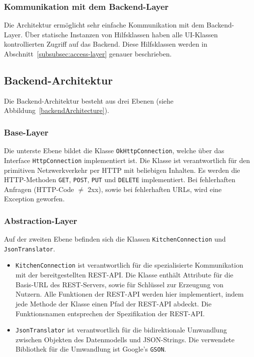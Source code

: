 \subsubsection{Kommunikation mit dem Backend-Layer}

Die Architektur ermöglicht sehr einfache Kommunikation mit dem Backend-Layer.
Über statische Instanzen von Hilfsklassen haben alle UI-Klassen kontrollierten Zugriff auf das Backend.
Diese Hilfsklassen werden in Abschnitt~\ref{subsubsec:access-layer} genauer beschrieben.

\subsection{Backend-Architektur}\label{subsec:backend}

Die Backend-Architektur besteht aus drei Ebenen (siehe Abbildung~\ref{backendArchitecture}).

\subsubsection{Base-Layer}

Die unterste Ebene bildet die Klasse \texttt{OkHttpConnection}, welche über das Interface \texttt{HttpConnection} implementiert ist.
Die Klasse ist verantwortlich für den primitiven Netzwerkverkehr per HTTP mit beliebigen Inhalten.
Es werden die HTTP-Methoden \texttt{GET}, \texttt{POST}, \texttt{PUT} und \texttt{DELETE} implementiert.
Bei fehlerhaften Anfragen (HTTP-Code $\neq$ 2xx), sowie bei fehlerhaften URLs, wird eine Exception geworfen.

\subsubsection{Abstraction-Layer}

Auf der zweiten Ebene befinden sich die Klassen \texttt{KitchenConnection} und \texttt{JsonTranslator}.

\begin{itemize}
	\item  \texttt{KitchenConnection} ist verantwortlich für die spezialisierte Kommunikation mit der bereitgestellten REST-API. Die Klasse enthält Attribute für die Basis-URL des REST-Servers, sowie für Schlüssel zur Erzeugung von Nutzern.
	Alle Funktionen der REST-API werden hier implementiert, indem jede Methode der Klasse einen Pfad der REST-API abdeckt.
	Die Funktionsnamen entsprechen der Spezifikation der REST-API\@.

	\item \texttt{JsonTranslator} ist verantwortlich für die bidirektionale Umwandlung zwischen Objekten des Datenmodells und JSON-Strings.
	Die verwendete Bibliothek für die Umwandlung ist Google's \texttt{GSON}.
\end{itemize}

